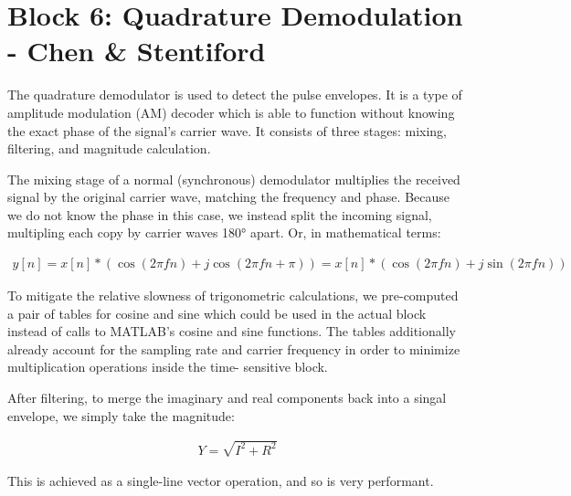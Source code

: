 
\section{Block 6: Quadrature Demodulation - Chen \& Stentiford}

The quadrature demodulator is used to detect the pulse envelopes. It is a type of 
amplitude modulation (AM) decoder which is able to function without knowing the exact 
phase of the signal's carrier wave. It consists of three stages: mixing, filtering, 
and magnitude calculation.

The mixing stage of a normal (synchronous) demodulator multiplies the received signal 
by the original carrier wave, matching the frequency and phase. Because we do not know 
the phase in this case, we instead split the incoming signal, multipling each copy by 
carrier waves 180° apart. Or, in mathematical terms:

\begin{align*}
    y[n] = x[n]*(\cos(2 \pi f n)+j \cos(2 \pi f n+\pi)) = x[n]*(\cos(2 \pi f n)+j \sin(2 \pi f n))
\end{align*}

To mitigate the relative slowness of trigonometric calculations, we pre-computed a pair of 
tables for cosine and sine which could be used in the actual block instead of calls to 
MATLAB's cosine and sine functions. The tables additionally already account for the sampling 
rate and carrier frequency in order to minimize multiplication operations inside the time-
sensitive block.

After filtering, to merge the imaginary and real components back into a singal envelope, we 
simply take the magnitude:

\begin{align*}
    Y = \sqrt{I^2 + R^2}
\end{align*}

This is achieved as a single-line vector operation, and so is very performant.